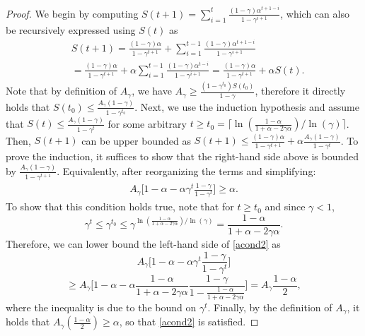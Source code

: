 \documentclass[10pt,a4paper]{amsart}
\begin{document}
\begin{proof}
 We begin by computing 
 $S(t+1) = \sum_{i=1}^{t}  \frac{(1-\gamma)\alpha^{t+1-i}}{1 - \gamma^{i+1}} $, which can also be recursively expressed using $S(t)$ as
    \begin{align}
        &S(t+1) =  \frac{(1-\gamma)\alpha}{1-\gamma^{t+1}} + \sum_{i=1}^{t-1}  \frac{(1-\gamma)\alpha^{t+1-i}}{1 - \gamma^{i+1}}\nonumber\nonumber\\
        &\!\!{=}\frac{(1-\gamma)\alpha}{1-\gamma^{t+1}} + \alpha \sum_{i=1}^{t-1}  \frac{(1-\gamma)\alpha^{t-i}}{1 - \gamma^{i+1}} = \frac{(1-\gamma)\alpha}{1-\gamma^{t+1}} + \alpha S(t).\label{Discount_Sum_recursive}
    \end{align}
Note that by definition of $A_\gamma$, we have $A_\gamma \geq \frac{(1-\gamma^{t_0})S(t_0)}{1-\gamma}$, therefore it directly holds that $S(t_0) \leq \frac{A_\gamma(1-\gamma)}{1-\gamma^{t_0}}$. Next, we use the induction hypothesis and assume that $ S(t) \leq \frac{A_\gamma(1-\gamma)}{1-\gamma^t}$ for some arbitrary $t\geq t_0 =\lceil\ln(\frac{1-\alpha}{1+\alpha-2\gamma\alpha})/\ln(\gamma)\rceil$. Then, $S(t+1)$ can be upper bounded as $S(t+1) \leq  \frac{(1-\gamma)\alpha}{1-\gamma^{t+1}} + \alpha  \frac{A_\gamma(1-\gamma)}{1-\gamma^t}$. To prove the induction, it suffices to show that 
    the right-hand side above is bounded by $\frac{A_\gamma(1-\gamma)}{1-\gamma^{t+1}}$. Equivalently, after reorganizing the terms and simplifying:
\begin{align}
    A_\gamma\Big[
1-\alpha-\alpha\gamma^t\frac{
1-\gamma}{1-\gamma^t}
\Big]
\geq \alpha.
\label{acond2}
\end{align}
    To show that this condition holds true, note that for $t\geq t_0$ and since $\gamma<1$,
    $$
    \gamma^t\leq \gamma^{t_0}
    \leq
    \gamma^{\ln(\frac{1-\alpha}{1+\alpha-2\gamma\alpha})/\ln(\gamma)}
    =
\frac{1-\alpha}{1+\alpha-2\gamma\alpha}.
    $$
    Therefore, we can lower bound the left-hand side of \eqref{acond2} as
    $$
    A_\gamma\Big[
1-\alpha-\alpha\gamma^t\frac{
1-\gamma}{1-\gamma^t}
\Big]
$$$$
\geq
A_\gamma\Big[
1-\alpha-\alpha
\frac{1-\alpha}{1+\alpha-2\gamma\alpha}
\frac{
1-\gamma}{1-\frac{1-\alpha}{1+\alpha-2\gamma\alpha}}
\Big]
=
A_\gamma\frac{1-\alpha}{2},
    $$
    where the inequality is due to the bound on $\gamma^t$.
    Finally, by the definition of 
    $A_\gamma$, it holds that 
    $A_\gamma(\frac{1-\alpha}{2})\geq \alpha$, 
    so that \eqref{acond2} is satisfied.

\end{proof}
\end{document}
